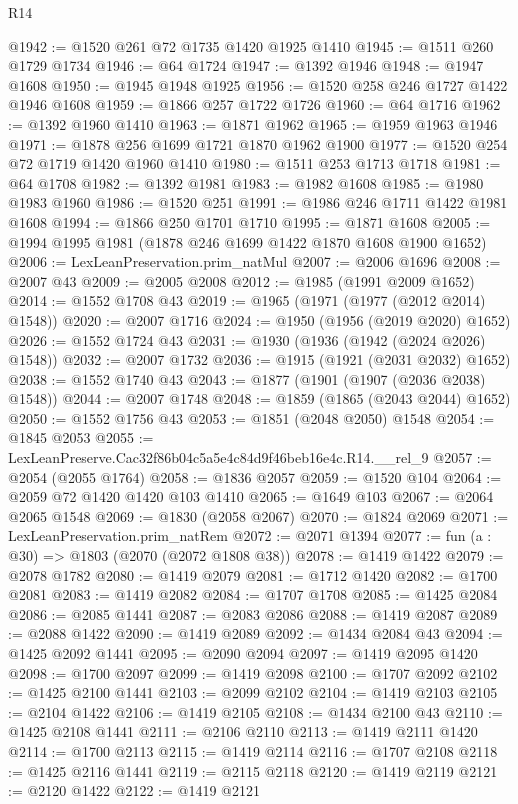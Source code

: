 \begin{lexlean}{R14}
\begin{coremodule}
@1942 := @1520 @261 @72 @1735 @1420 @1925 @1410
@1945 := @1511 @260 @1729 @1734
@1946 := @64 @1724
@1947 := @1392 @1946
@1948 := @1947 @1608
@1950 := @1945 @1948 @1925
@1956 := @1520 @258 @246 @1727 @1422 @1946 @1608
@1959 := @1866 @257 @1722 @1726
@1960 := @64 @1716
@1962 := @1392 @1960 @1410
@1963 := @1871 @1962
@1965 := @1959 @1963 @1946
@1971 := @1878 @256 @1699 @1721 @1870 @1962 @1900
@1977 := @1520 @254 @72 @1719 @1420 @1960 @1410
@1980 := @1511 @253 @1713 @1718
@1981 := @64 @1708
@1982 := @1392 @1981
@1983 := @1982 @1608
@1985 := @1980 @1983 @1960
@1986 := @1520 @251
@1991 := @1986 @246 @1711 @1422 @1981 @1608
@1994 := @1866 @250 @1701 @1710
@1995 := @1871 @1608
@2005 := @1994 @1995 @1981 (@1878 @246 @1699 @1422 @1870 @1608 @1900 @1652)
@2006 := LexLeanPreservation.prim_natMul
@2007 := @2006 @1696
@2008 := @2007 @43
@2009 := @2005 @2008
@2012 := @1985 (@1991 @2009 @1652)
@2014 := @1552 @1708 @43
@2019 := @1965 (@1971 (@1977 (@2012 @2014) @1548))
@2020 := @2007 @1716
@2024 := @1950 (@1956 (@2019 @2020) @1652)
@2026 := @1552 @1724 @43
@2031 := @1930 (@1936 (@1942 (@2024 @2026) @1548))
@2032 := @2007 @1732
@2036 := @1915 (@1921 (@2031 @2032) @1652)
@2038 := @1552 @1740 @43
@2043 := @1877 (@1901 (@1907 (@2036 @2038) @1548))
@2044 := @2007 @1748
@2048 := @1859 (@1865 (@2043 @2044) @1652)
@2050 := @1552 @1756 @43
@2053 := @1851 (@2048 @2050) @1548
@2054 := @1845 @2053
@2055 := LexLeanPreserve.Cac32f86b04c5a5e4c84d9f46beb16e4c.R14.__rel_9
@2057 := @2054 (@2055 @1764)
@2058 := @1836 @2057
@2059 := @1520 @104
@2064 := @2059 @72 @1420 @1420 @103 @1410
@2065 := @1649 @103
@2067 := @2064 @2065 @1548
@2069 := @1830 (@2058 @2067)
@2070 := @1824 @2069
@2071 := LexLeanPreservation.prim_natRem
@2072 := @2071 @1394
@2077 := fun (a : @30) => @1803 (@2070 (@2072 @1808 @38))
@2078 := @1419 @1422
@2079 := @2078 @1782
@2080 := @1419 @2079
@2081 := @1712 @1420
@2082 := @1700 @2081
@2083 := @1419 @2082
@2084 := @1707 @1708
@2085 := @1425 @2084
@2086 := @2085 @1441
@2087 := @2083 @2086
@2088 := @1419 @2087
@2089 := @2088 @1422
@2090 := @1419 @2089
@2092 := @1434 @2084 @43
@2094 := @1425 @2092 @1441
@2095 := @2090 @2094
@2097 := @1419 @2095 @1420
@2098 := @1700 @2097
@2099 := @1419 @2098
@2100 := @1707 @2092
@2102 := @1425 @2100 @1441
@2103 := @2099 @2102
@2104 := @1419 @2103
@2105 := @2104 @1422
@2106 := @1419 @2105
@2108 := @1434 @2100 @43
@2110 := @1425 @2108 @1441
@2111 := @2106 @2110
@2113 := @1419 @2111 @1420
@2114 := @1700 @2113
@2115 := @1419 @2114
@2116 := @1707 @2108
@2118 := @1425 @2116 @1441
@2119 := @2115 @2118
@2120 := @1419 @2119
@2121 := @2120 @1422
@2122 := @1419 @2121

\end{coremodule}
\end{lexlean}
